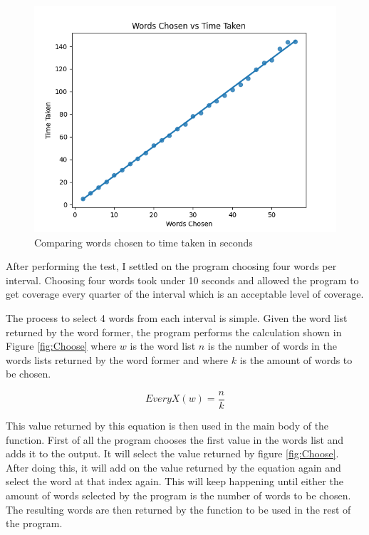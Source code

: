 \documentclass[10pt,a4paper]{report}
\begin{document}
\begin{figure}
	\centering
	\includegraphics[scale=0.70]{WordsChosenVsTime}
	\caption{Comparing words chosen to time taken in seconds}
	\label{fig:WordsvsTime}
\end{figure}

After performing the test, I settled on the program choosing four words per interval. Choosing four words took under 10 seconds and allowed the program to get coverage every quarter of the interval which is an acceptable level of coverage.

The process to select 4 words from each interval is simple. Given the word list returned by the word former, the program performs the calculation shown in Figure \ref{fig:Choose} where \(w\) is the word list \(n\) is the number of words in the words lists returned by the word former and where \(k\) is the amount of words to be chosen.

\begin{equation}
\textit{EveryX}(w) = \frac{n}{k}
\label{fig:Choose}
\end{equation}

This value returned by this equation is then used in the main body of the function. First of all the program chooses the first value in the words list and adds it to the output. It will select the value returned by figure \ref{fig:Choose}. After doing this, it will add on the value returned by the equation again and select the word at that index again. This will keep happening until either the amount of words selected by the program is the number of words to be chosen. The resulting words are then returned by the function to be used in the rest of the program. 
\end{document}

